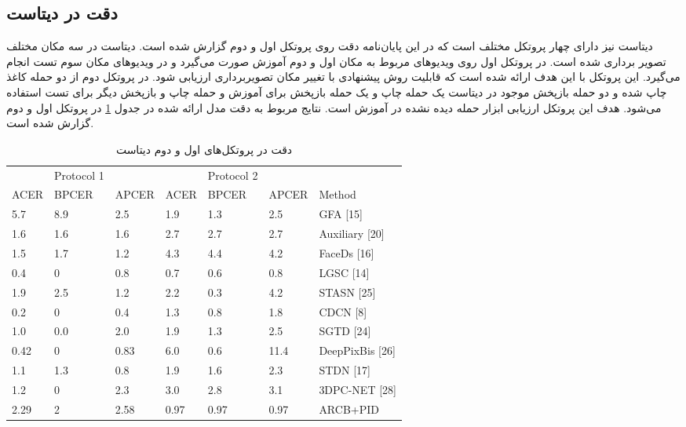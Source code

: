 \subsection{دقت در دیتاست }
دیتاست  نیز دارای چهار پروتکل مختلف است که در این پایان‌نامه دقت روی پروتکل اول و دوم گزارش شده است. 
دیتاست  در سه مکان مختلف تصویر برداری شده است. در پروتکل اول روی ویدیوهای مربوط به مکان اول و دوم آموزش صورت می‌گیرد و در ویدیوهای مکان سوم تست انجام می‌گیرد. این پروتکل با این هدف ارائه شده است که قابلیت روش پیشنهادی با تغییر مکان تصویربرداری ارزیابی شود. 
در پروتکل دوم از دو حمله کاغذ چاپ شده و دو حمله بازپخش موجود در دیتاست یک حمله چاپ و یک حمله بازپخش برای آموزش و حمله چاپ و بازپخش دیگر برای تست استفاده می‌شود. هدف این پروتکل ارزیابی ابزار حمله دیده نشده در آموزش است. نتایج مربوط به دقت مدل ارائه شده در جدول
\ref{tab:oulu}
در پروتکل اول و دوم گزارش شده است.
\begin{table}[ht]
	\caption{دقت در پروتکل‌های اول و دوم دیتاست }
	\label{tab:oulu}
	\centering
	\onehalfspacing
	\begin{tabular}{lllllll}
     & Protocol 				1 &       &      & Protocol 				2 &       &                         \\
ACER & BPCER          & APCER & ACER & BPCER          & APCER & Method                  \\
5.7  & 8.9            & 2.5   & 1.9  & 1.3            & 2.5   & GFA 				{[}15{]}        \\
1.6  & 1.6            & 1.6   & 2.7  & 2.7            & 2.7   & Auxiliary 				{[}20{]}  \\
1.5  & 1.7            & 1.2   & 4.3  & 4.4            & 4.2   & FaceDs 				{[}16{]}     \\
0.4  & 0              & 0.8   & 0.7  & 0.6            & 0.8   & LGSC 				{[}14{]}       \\
1.9  & 2.5            & 1.2   & 2.2  & 0.3            & 4.2   & STASN 				{[}25{]}      \\
0.2  & 0              & 0.4   & 1.3  & 0.8            & 1.8   & CDCN 				{[}8{]}        \\
1.0  & 0.0            & 2.0   & 1.9  & 1.3            & 2.5   & SGTD 				{[}24{]}       \\
0.42 & 0              & 0.83  & 6.0  & 0.6            & 11.4  & DeepPixBis 				{[}26{]} \\
1.1  & 1.3            & 0.8   & 1.9  & 1.6            & 2.3   & STDN 				{[}17{]}       \\
1.2  & 0              & 2.3   & 3.0  & 2.8            & 3.1   & 3DPC-NET 				{[}28{]}   \\
2.29 & 2              & 2.58  & 0.97 & 0.97           & 0.97  & ARCB+PID \\              
		\hline         
	\end{tabular}
\end{table}

